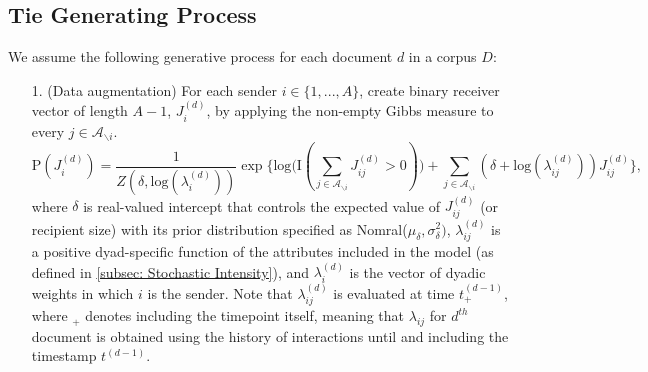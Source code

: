 \documentclass[a4paper]{article}
\begin{document}
\subsection{Tie Generating Process}\label{subsec: Tie Generating Process}
We assume the following generative process for each document $d$ in a corpus $D$:
\begin{itemize}
	\item[1.] (Data augmentation) For each sender $i \in \{1,...,A\}$, create binary receiver vector of length $A-1$, $J^{(d)}_i$, by applying the non-empty Gibbs measure to every $j \in \mathcal{A}_{\backslash i}$. 
	\begin{equation} \text{P}(J_i^{(d)}) = \frac{1}{Z(\delta,\mbox{log}(\lambda_i^{(d)}))} \exp\Big\{ \mbox{log}\big(\text{I}( \sum_{j \in \mathcal{A}_{\backslash i}} J^{(d)}_{ij} > 0 )\big) + \sum_{j \in \mathcal{A}_{\backslash i}} (\delta+\mbox{log}(\lambda_{ij}^{(d)}))J_{ij}^{(d)} \Big\},
	\end{equation}
	where $\delta$ is real-valued intercept that controls the expected value of $J_{ij}^{(d)}$ (or recipient size) with its prior distribution specified as Nomral($\mu_\delta, \sigma^2_\delta)$, $\lambda_{ij}^{(d)}$ is a positive dyad-specific function of the attributes included in the model (as defined in \ref{subsec: Stochastic Intensity}), and $\lambda_{i}^{(d)}$ is the vector of dyadic weights in which $i$ is the sender. Note that $\lambda_{ij}^{(d)}$ is evaluated at time $t_+^{(d-1)}$, where $_+$ denotes including the timepoint itself, meaning that $\lambda_{ij}$ for $d^{th}$ document is obtained using the history of interactions until and including the timestamp $t^{(d-1)}$.\\
	

\end{itemize}
\end{document}

